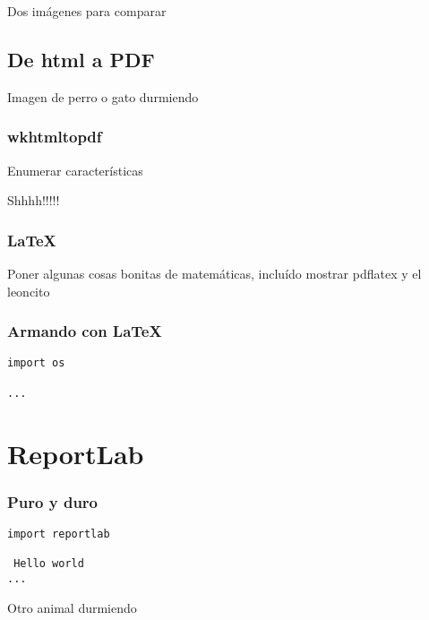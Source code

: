 \documentclass[10pt,xcolor={usenames,dvipsnames}]{beamer}
\begin{document}
\begin{frame}

Dos imágenes para comparar

\end{frame}

\subsection{De html a PDF}

\begin{frame}

Imagen de perro o gato durmiendo

\end{frame}

\begin{frame}
\frametitle{wkhtmltopdf}
Enumerar características

\end{frame}

\begin{frame}

Shhhh!!!!!

\end{frame}

\begin{frame}
\frametitle{\LaTeX}

Poner algunas cosas bonitas de matemáticas, incluído mostrar pdflatex y el leoncito

\end{frame}

\begin{frame}[fragile]
\frametitle{Armando con \LaTeX}
\begin{verbatim}
import os

...
\end{verbatim}
\end{frame}


\section{ReportLab}

\begin{frame}[fragile]
\frametitle{Puro y duro}
\begin{verbatim}
import reportlab

 Hello world
...
\end{verbatim}
\end{frame}

\begin{frame}

Otro animal durmiendo

\end{frame}
\end{document}

